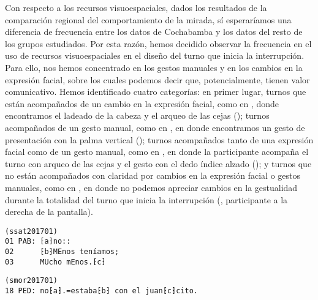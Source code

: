 \documentclass[output=paper]{../langscibook}
\begin{document}
Con respecto a los recursos visuoespaciales, dados los resultados de la comparación regional del comportamiento de la mirada, sí esperaríamos una diferencia de frecuencia entre los datos de Cochabamba y los datos del resto de los grupos estudiados. Por esta razón, hemos decidido observar la frecuencia en el uso de recursos visuoespaciales en el diseño del turno \citep{Drew2012} que inicia la interrupción. Para ello, nos hemos concentrado en los gestos manuales y en los cambios en la expresión facial, sobre los cuales podemos decir que, potencialmente, tienen valor comunicativo. Hemos identificado cuatro categorías: en primer lugar, turnos que están acompañados de un cambio en la expresión facial, como en , donde encontramos el ladeado de la cabeza y el arqueo de las cejas (); turnos acompañados de un gesto manual, como en , en donde encontramos un gesto de presentación con la palma vertical (); turnos acompañados tanto de una expresión facial como de un gesto manual, como en , en donde la participante acompaña el turno con arqueo de las cejas y el gesto con el dedo índice alzado (); y turnos que no están acompañados con claridad por cambios en la expresión facial o gestos manuales, como en , en donde no podemos apreciar cambios en la gestualidad durante la totalidad del turno que inicia la interrupción (, participante a la derecha de la pantalla).

\ea\label{ex:satti:7}
\begin{verbatim}
(ssat201701)
01 PAB: ⁅a⁆no::
02      ⁅b⁆MEnos teníamos;
03      MUcho mEnos.⁅c⁆
\end{verbatim}
\z

\begin{figure}
%
%
\caption{}
\label{fig:satti:1112131}
\end{figure}

\largerpage[2]
\ea\label{ex:satti:8}
\begin{verbatim}
(smor201701)
18 PED: no⁅a⁆.=estaba⁅b⁆ con el juan⁅c⁆cito.
\end{verbatim}
\z
\end{document}
